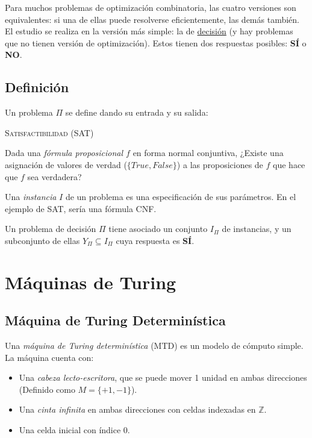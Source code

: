 \documentclass[a4paper]{report}
\newcommand{\Z}{\mathbb{Z}}
\begin{document}
Para muchos problemas de optimización combinatoria, las cuatro versiones son equivalentes: si una de ellas puede resolverse eficientemente, las demás también. El estudio se realiza en la versión más simple: la de \underline{decisión} (y hay problemas que no tienen versión de optimización). Estos tienen dos respuestas posibles: \textbf{SÍ} o \textbf{NO}.

\subsection{Definición}

Un problema $\Pi$ se define dando su entrada y su salida:
\begin{problema}
    \textsc{Satisfactibilidad (SAT)}
    \medskip

    Dada una \textit{fórmula proposicional $f$} en forma normal conjuntiva, ¿Existe una asignación de valores de verdad ($\{True, False\}$) a las proposiciones de $f$ que hace que $f$ sea verdadera?
\end{problema}

Una \textit{instancia} $I$ de un problema es una especificación de sus parámetros. En el ejemplo de SAT, sería una fórmula CNF.

Un problema de decisión $\Pi$ tiene asociado un conjunto $I_{\Pi}$ de instancias, y un subconjunto de ellas $Y_{\Pi} \subseteq I_{\Pi}$ cuya respuesta es \textbf{SÍ}.

\section{Máquinas de Turing}

\subsection{Máquina de Turing Determinística}

Una \textit{máquina de Turing determinística} (MTD) es un modelo de cómputo simple. La máquina cuenta con:
\begin{itemize}
    \item Una \textit{cabeza lecto-escritora}, que se puede mover 1 unidad en ambas direcciones (Definido como $M = \{+1, -1\}$).
    \item Una \textit{cinta infinita} en ambas direcciones con celdas indexadas en $\Z$.
    \item Una celda inicial con índice $0$.
\end{itemize}
\end{document}
